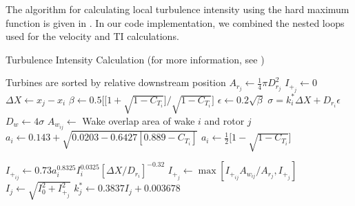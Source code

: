 \documentclass[conf]{new-aiaa}
\begin{document}
The algorithm for calculating local turbulence intensity using the hard maximum function is given in . In our code implementation, we combined the nested loops used for the velocity and TI calculations. 
%
\begin{algorithm}[htpb!]
	\caption{Turbulence Intensity Calculation (for more information, see \cite{niayifar2016})}
   \label{alg:ti}
   \begin{algorithmic}
   \Ensure Turbines are sorted by relative downstream position
      
    \State $A_{r_j} \gets \frac{1}{4}\pi D_{r_j}^2$ 
    \State $I_{+_j} \gets 0$
          
         	\State $\Delta X \gets x_j - x_i$ 
               \State $\beta \gets 0.5\Big[\Big[1+\sqrt{1-C_{T_i}}\Big]/\sqrt{1-C_{T_i}}\Big]$
               \State $\epsilon \gets 0.2 \sqrt{\beta}$
               \State $\sigma = k_i^*\Delta X+D_{r_i}\epsilon$
               \State $D_w \gets 4\sigma$
               \State $A_{w_{ij}} \gets$ Wake overlap area of wake $i$ and rotor $j$ 
                    \State $a_i \gets 0.143 + \sqrt{0.0203-0.6427[0.889 - C_{T_i}]}$ 
               \Else
                   \State $a_i \gets  \frac{1}{2}\Big[1-\sqrt{1-C_{T_i}}\Big]$
               \EndIf
               
               \State $I_{+_{ij}} \gets 0.73 a_{i}^{0.8325} I_i^{0.0325} [\Delta X/D_{r_i}]^{-0.32}$
               \State $I_{+_j} \gets \max{[I_{+_{ij}}A_{w_{ij}}/A_{r_j}, I_{+_j}]}$ 
        	\EndIf
        \EndFor
        \State $I_j \gets \sqrt{I_{0}^2 + I_{+_j}^2}$ 
        \State $k_j^* \gets 0.3837I_j+0.003678 $ 
     \EndFor
   \end{algorithmic}    
\end{algorithm}
%
\end{document}
